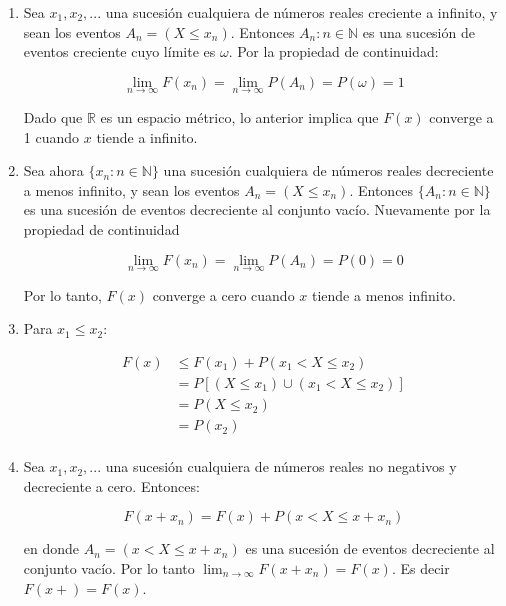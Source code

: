\begin{enumerate}
\item Sea $x_1, x_2, ...$ una sucesión cualquiera de números reales creciente a
infinito, y sean los eventos $A_n = (X \leq x_n)$. Entonces ${A_n : n \in
\mathbb{N}}$ es una sucesión de eventos creciente cuyo límite es $\omega$. Por
la propiedad de continuidad:

\begin{equation}
    \lim_{n \rightarrow \infty} F(x_n) = \lim_{n \rightarrow \infty} P(A_n) = P(\omega) = 1
\end{equation}

Dado que $\mathbb{R}$ es un espacio métrico, lo anterior implica que $F(x)$
converge a 1 cuando $x$ tiende a infinito.

\item Sea ahora $\{x_n : n \in \mathbb{N} \}$ una sucesión cualquiera de números
reales decreciente a menos infinito, y sean los eventos $A_n = (X \leq x_n )$.
Entonces $\{A_n : n \in \mathbb{N}\}$ es una sucesión de eventos decreciente al
conjunto vacío. Nuevamente por la propiedad de continuidad

\begin{equation}
    \lim_{n \rightarrow \infty} F(x_n) = \lim_{n \rightarrow \infty} P(A_n) = P(0) = 0
\end{equation}

Por lo tanto, $F(x)$ converge a cero cuando $x$ tiende a menos infinito.

\item Para $x_1 \leq x_2$:

\begin{equation}
    \begin{array}{ll}
        F(x)    & \leq F(x_1) + P(x_1 < X \leq x_2) \\
                & = P[(X \leq x_1) \cup (x_1 < X \leq x_2)] \\
                & = P(X \leq x_2) \\
                & = P(x_2) \\
    \end{array}
\end{equation}

\item Sea $x_1 , x_2 ,...$ una sucesión cualquiera de números reales no negativos
y decreciente a cero. Entonces:

\begin{equation}
    F (x + x_n ) = F (x) + P (x < X \leq x + x_n )
\end{equation}

en donde $A_n = (x < X \leq x + x_n )$ es una sucesión de eventos decreciente al
conjunto vacío. Por lo tanto $\lim_{n \rightarrow \infty} F(x + x_n ) = F (x)$.
Es decir $F (x+) = F (x)$.

\end{enumerate}


